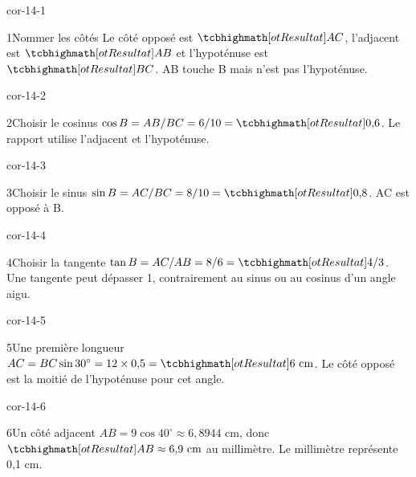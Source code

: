 \clearpage\pagestyle{otMain}\fontsize{11}{15}\selectfont{}
\begin{blocLivre}{cor-14-1}\begin{corrige}{1}{Nommer les côtés}
Le côté opposé est $\res{AC}$, l’adjacent est $\res{AB}$ et l’hypoténuse est $\res{BC}$. AB touche B mais n’est pas l’hypoténuse.
\label{fig-cor-14-1}
\end{corrige}\end{blocLivre}
\begin{blocLivre}{cor-14-2}\begin{corrige}{2}{Choisir le cosinus}
$\cos B=AB/BC=6/10=\res{0{,}6}$. Le rapport utilise l’adjacent et l’hypoténuse.
\label{fig-cor-14-2}
\end{corrige}\end{blocLivre}
\begin{blocLivre}{cor-14-3}\begin{corrige}{3}{Choisir le sinus}
$\sin B=AC/BC=8/10=\res{0{,}8}$. AC est opposé à B.
\label{fig-cor-14-3}
\end{corrige}\end{blocLivre}
\begin{blocLivre}{cor-14-4}\begin{corrige}{4}{Choisir la tangente}
$\tan B=AC/AB=8/6=\res{4/3}$. Une tangente peut dépasser 1, contrairement au sinus ou au cosinus d’un angle aigu.
\label{fig-cor-14-4}
\end{corrige}\end{blocLivre}
\begin{blocLivre}{cor-14-5}\begin{corrige}{5}{Une première longueur}
$AC=BC\sin30^\circ=12\times0{,}5=\res{6\text{ cm}}$. Le côté opposé est la moitié de l’hypoténuse pour cet angle.
\label{fig-cor-14-5}
\end{corrige}\end{blocLivre}
\begin{blocLivre}{cor-14-6}\begin{corrige}{6}{Un côté adjacent}
$AB=9\cos40^\circ\approx6{,}8944$ cm, donc $\res{AB\approx6{,}9\text{ cm}}$ au millimètre. Le millimètre représente 0,1 cm.
\label{fig-cor-14-6}
\end{corrige}\end{blocLivre}
